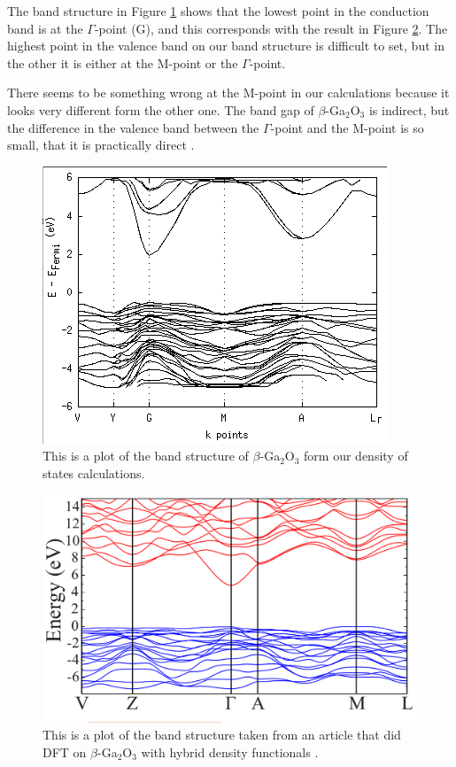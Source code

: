 The band structure in Figure \ref{fig:bandstructure_primitive} shows that the lowest point in the conduction band is at the $\Gamma$-point (G), and this corresponds with the result in Figure \ref{fig:bandstructure_fasit}. The highest point in the valence band on our band structure is difficult to set, but in the other it is either at the M-point or the $\Gamma$-point.

There seems to be something wrong at the M-point in our calculations because it looks very different form the other one. The band gap of $\beta$-Ga$_2$O$_3$ is indirect, but the difference in the valence band between the $\Gamma$-point and the M-point is so small, that it is practically direct \cite{dft_ga2o3}.

\begin{figure}[H]\caption{This is a plot of the band structure of $\beta$-Ga$_2$O$_3$ form our density of states calculations.}\label{fig:bandstructure_primitive}
\includegraphics[width=\linewidth]{../fig/primitive/bandstructure}
\end{figure}

\begin{figure}[H]\caption{This is a plot of the band structure taken from an article that did DFT on $\beta$-Ga$_2$O$_3$ with hybrid density functionals \cite{dft_ga2o3}.}\label{fig:bandstructure_fasit}
\includegraphics[width=\linewidth]{../fig/band_structure}
\end{figure}


